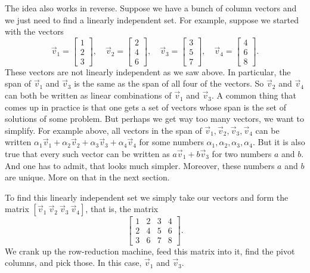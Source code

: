 The idea also works in reverse.  Suppose we have a bunch of column vectors
and we just need to find a linearly independent set.  For example, suppose
we started with the vectors
\begin{equation*}
\vec{v}_1 =
\begin{bmatrix}
1 \\
2 \\
3 
\end{bmatrix}
,
\quad
\vec{v}_2 =
\begin{bmatrix}
2 \\
4 \\
6
\end{bmatrix}
,
\quad
\vec{v}_3 =
\begin{bmatrix}
3 \\
5 \\
7
\end{bmatrix}
,
\quad
\vec{v}_4 =
\begin{bmatrix}
4 \\
6 \\
8
\end{bmatrix} .
\end{equation*}
These vectors are not linearly independent as we saw above.  In particular,
the span of $\vec{v}_1$ and $\vec{v}_3$ is the same as
the span of all four of the vectors.  So $\vec{v}_2$ and $\vec{v}_4$
can both be written as linear combinations of $\vec{v}_1$ and $\vec{v}_3$.
A common thing that comes up in practice is that one gets a set of vectors
whose span is the set of solutions of some problem.  But perhaps we get way
too many vectors, we want to simplify.  For example above, all vectors in
the span of
$\vec{v}_1, \vec{v}_2, \vec{v}_3, \vec{v}_4$ can be written
$\alpha_1 \vec{v}_1 + \alpha_2 \vec{v}_2 + \alpha_3 \vec{v}_3 + \alpha_4
\vec{v}_4$ for some numbers $\alpha_1,\alpha_2,\alpha_3,\alpha_4$.  But
it is also true that every such vector can be written as
$a \vec{v}_1 + b \vec{v}_3$ for two numbers $a$ and $b$.  And one has to
admit, that looks much simpler.  Moreover, these numbers $a$ and $b$ are
unique.  More on that in the next section.

To find this linearly independent set we simply take our vectors
and form the matrix $[ \vec{v}_1 ~ \vec{v}_2 ~ \vec{v}_3 ~ \vec{v}_4 ]$,
that is, the matrix
\begin{equation*}
\begin{bmatrix}
1 & 2 & 3 & 4 \\
2 & 4 & 5 & 6 \\
3 & 6 & 7 & 8
\end{bmatrix} .
\end{equation*}
We crank up the row-reduction machine, feed this matrix into it, find
the pivot columns, and pick those.  In this case, $\vec{v}_1$ and
$\vec{v}_3$.

